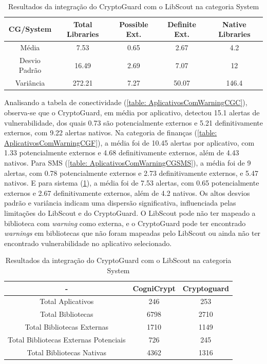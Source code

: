 \begin{table}[!htbp]
  \centering
  \small
  \begin{tabular}{|c|c|c|c|c|}
    \hline
    \textbf{CG/System} & \textbf{Total Libraries} & \textbf{Possible Ext.} & \textbf{Definite Ext.} & \textbf{Native Libraries} \\
    \hline
    Média & \num{7.53} & \num{0.65} & \num{2.67} & \num{4.2} \\
    Desvio Padrão & \num{16.49} & \num{2.69} & \num{7.07} & \num{12} \\
    Variância & \num{272.21} & \num{7.27} & \num{50.07} & \num{146.4} \\
    \hline
  \end{tabular}
  \caption{Resultados da integração do CryptoGuard com o LibScout na categoria System}
  \label{table: AplicativosComWarningCGS}
\end{table}

Analisando a tabela de conectividade (\ref{table: AplicativosComWarningCGC}), observa-se que o CryptoGuard, em média por aplicativo, detectou \num{15.1} alertas de vulnerabilidade, dos quais \num{0.73} são potencialmente externos e \num{5.21} definitivamente externos, com \num{9.22} alertas nativos. 
Na categoria de finanças (\ref{table: AplicativosComWarningCGF}), a média foi de \num{10.45} alertas por aplicativo, com \num{1.33} potencialmente externos e \num{4.68} definitivamente externos, além de \num{4.43} nativos.
Para SMS (\ref{table: AplicativosComWarningCGSMS}), a média foi de \num{9} alertas, com \num{0.78} potencialmente externos e \num{2.73} definitivamente externos, e \num{5.47} nativos.
E para sistema (\ref{table: AplicativosComWarningCGS}), a média foi de \num{7.53} alertas, com \num{0.65} potencialmente externos e \num{2.67} definitivamente externos, além de \num{4.2} nativos. 
Os altos desvios padrão e variância indicam uma dispersão significativa, influenciada pelas limitações do LibScout e do CryptoGuard. O LibScout pode não ter mapeado a biblioteca com \textit{warning} como externa, e o CryptoGuard pode ter encontrado \textit{warnings} em bibliotecas que não foram mapeadas pelo LibScout ou ainda não ter encontrado vulnerabilidade no aplicativo selecionado.


\begin{table}[!htbp]
  \centering
  \small
  \begin{tabular}{|c|c|c|}
    \hline
    \textbf{-} & \textbf{CogniCrypt} & \textbf{Cryptoguard} \\
    \hline
    Total Aplicativos & \num{246} & \num{253} \\
    Total Bibliotecas & \num{6798} & \num{2710}  \\
    Total Bibliotecas Externas & \num{1710} & \num{1149} \\
    Total Bibliotecas Externas Potenciais & \num{726} & \num{245} \\
    Total Bibliotecas Nativas & \num{4362} & \num{1316} \\
    \hline
  \end{tabular}
  \caption{Resultados da integração do CryptoGuard com o LibScout na categoria System}
  \label{table: AplicativosComWarningSummary}
\end{table}

